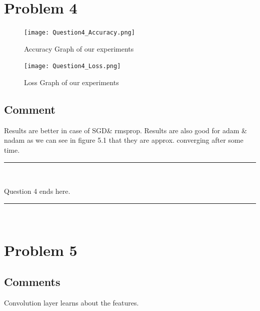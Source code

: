 \documentclass[paper=a4, fontsize=11pt]{scrartcl} %
\numberwithin{equation}{section} %
\numberwithin{figure}{section} %
\numberwithin{table}{section} %
\newcommand{\horrule}[1]{\rule{\linewidth}{#1}} %
\begin{document}

\pagebreak
\section{Problem 4}
\begin{figure}[h]
\begin{center}
\texttt{[image: Question4\_Accuracy.png]}
\end{center}
\caption{Accuracy Graph of our experiments}
\label{fig:demo}
\end{figure}

\pagebreak

\begin{figure}[h]
\begin{center}
\texttt{[image: Question4\_Loss.png]}
\end{center}
\caption{Loss Graph of our experiments}
\label{fig:demo}
\end{figure}

\subsection{Comment} 
Results are better in case of SGD\& rmsprop. Results are also good for adam \& nadam as we can see in figure 5.1 that they are approx. converging after some time.

\horrule{0.5pt} \\
\begin{center}
Question 4 ends here.
\horrule{2pt} \\
\end{center}
\pagebreak
 


\section{Problem 5}


\subsection{Comments} 
Convolution layer learns about the features.
\end{document}
